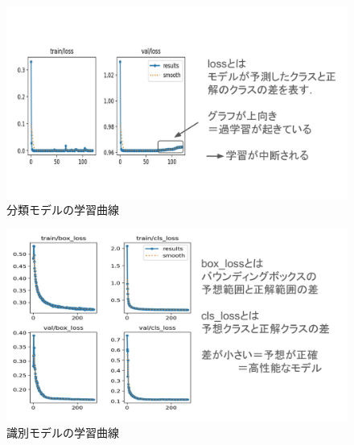 
\begin{figure}
	\centering
	\includegraphics[width=0.65\linewidth]{fig/results_cls}
	\caption[分類モデルの学習曲線]{分類モデルの学習曲線}
	\label{fig:resultscls}
\end{figure}

\newpage

\begin{figure}
	\centering
	\includegraphics[width=0.8\linewidth]{fig/results_det}
	\caption[識別モデルの学習曲線]{識別モデルの学習曲線}
	\label{fig:resultsdet}
\end{figure}


